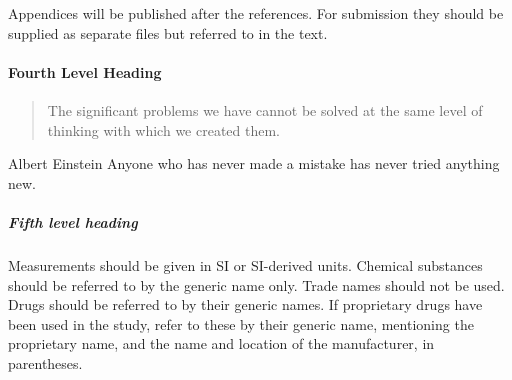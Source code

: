 Appendices will be published after the references. For submission they should be supplied as separate files but referred to in the text.

\paragraph{Fourth Level Heading}
\begin{quote}
       The significant problems we have cannot be solved at the same level of thinking with which we created them.
\end{quote}

\begin{epigraph}{Albert Einstein}
       Anyone who has never made a mistake has never tried anything new.
\end{epigraph}

\subparagraph{Fifth level heading}
Measurements should be given in SI or SI-derived units.
Chemical substances should be referred to by the generic name only. Trade names should not be used. Drugs should be referred to by their generic names. If proprietary drugs have been used in the study, refer to these by their generic name, mentioning the proprietary name, and the name and location of the manufacturer, in parentheses.

